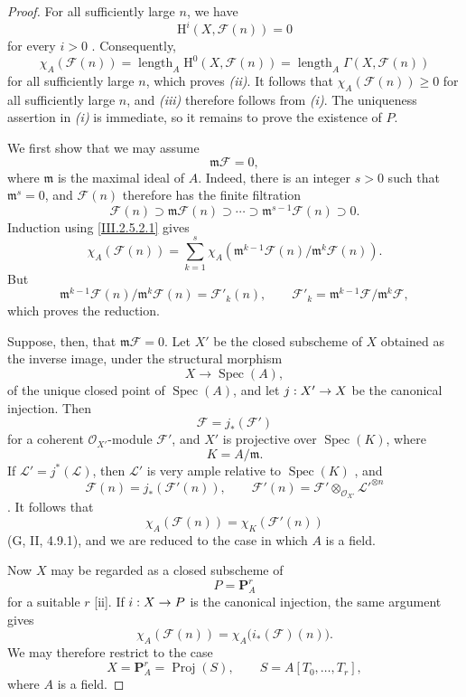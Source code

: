 \documentclass[oneside]{amsart}
\theoremstyle{ega-env-style}
\theoremstyle{ega-thm-env-style}
\theoremstyle{ega-defn-env-style}
\def\mathcal{\mathscr}
\def\sh{\mathcal}                   %
\def\geq{\geqslant}                 %
\def\HH{\mathrm{H}}                 %
\def\Proj{\operatorname{Proj}}
\def\Spec{\operatorname{Spec}}
\renewcommand{\to}{\mathchoice{\longrightarrow}{\rightarrow}{\rightarrow}{\rightarrow}}
\newcommand{\oldpage}[2][]{{\marginnote{\normalfont{\textbf{#1}~|~#2}}}\ignorespaces}
\begin{document}
\begin{proof}
For all sufficiently large $n$, we have
\[
  \HH^i(X,\sh{F}(n))=0
\]
for every $i>0$ .
\oldpage[III]{110}
Consequently,
\[
  \chi_A(\sh{F}(n))
  =
  \operatorname{length}_A\HH^0(X,\sh{F}(n))
  =
  \operatorname{length}_A\Gamma(X,\sh{F}(n))
\]
for all sufficiently large $n$, which proves \emph{(ii)}.
It follows that $\chi_A(\sh{F}(n))\geq0$ for all sufficiently large $n$, and \emph{(iii)} therefore follows from \emph{(i)}.
The uniqueness assertion in \emph{(i)} is immediate, so it remains to prove the existence of $P$.

We first show that we may assume
\[
  \mathfrak{m}\sh{F}=0,
\]
where $\mathfrak{m}$ is the maximal ideal of $A$.
Indeed, there is an integer $s>0$ such that $\mathfrak{m}^s=0$, and $\sh{F}(n)$ therefore has the finite filtration
\[
  \sh{F}(n)
  \supset\mathfrak{m}\sh{F}(n)
  \supset\cdots
  \supset\mathfrak{m}^{s-1}\sh{F}(n)
  \supset0.
\]
Induction using \eqref{III.2.5.2.1} gives
\[
  \chi_A(\sh{F}(n))
  =
  \sum_{k=1}^{s}
  \chi_A\left(
    \mathfrak{m}^{k-1}\sh{F}(n)/
    \mathfrak{m}^{k}\sh{F}(n)
  \right).
\]
But
\[
  \mathfrak{m}^{k-1}\sh{F}(n)/
  \mathfrak{m}^{k}\sh{F}(n)
  =
  \sh{F}'_k(n),
  \qquad
  \sh{F}'_k=
  \mathfrak{m}^{k-1}\sh{F}/\mathfrak{m}^{k}\sh{F},
\]
which proves the reduction.

Suppose, then, that $\mathfrak{m}\sh{F}=0$.
Let $X'$ be the closed subscheme of $X$ obtained as the inverse image, under the structural morphism
\[
  X\longrightarrow\Spec(A),
\]
of the unique closed point of $\Spec(A)$, and let $j:X'\to X$ be the canonical injection.
Then
\[
  \sh{F}=j_*(\sh{F}')
\]
for a coherent $\sh{O}_{X'}$-module $\sh{F}'$, and $X'$ is projective over $\Spec(K)$, where
\[
  K=A/\mathfrak{m}.
\]
If $\sh{L}'=j^*(\sh{L})$, then $\sh{L}'$ is very ample relative to $\Spec(K)$ , and
\[
  \sh{F}(n)=j_*(\sh{F}'(n)),
  \qquad
  \sh{F}'(n)
  =
  \sh{F}'\otimes_{\sh{O}_{X'}}\sh{L}'^{\otimes n}
\]
.
It follows that
\[
  \chi_A(\sh{F}(n))
  =
  \chi_K(\sh{F}'(n))
\]
(G, II, 4.9.1), and we are reduced to the case in which $A$ is a field.

Now $X$ may be regarded as a closed subscheme of
\[
  P=\mathbf{P}_A^r
\]
for a suitable $r$ [ii].
If $i:X\to P$ is the canonical injection, the same argument gives
\[
  \chi_A(\sh{F}(n))
  =
  \chi_A\bigl(i_*(\sh{F})(n)\bigr).
\]
We may therefore restrict to the case
\[
  X=\mathbf{P}_A^r=\Proj(S),
  \qquad
  S=A[T_0,\ldots,T_r],
\]
where $A$ is a field.


\end{proof}
\end{document}
